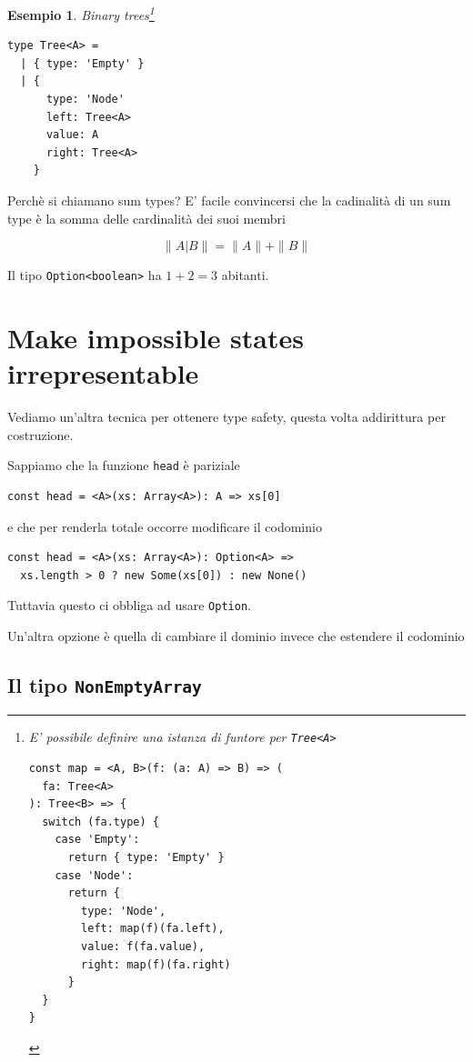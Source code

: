 \documentclass[12pt]{article}
\newtheorem{example}{Esempio}
\begin{document}
\begin{example}
Binary trees\footnote{E' possibile definire una istanza di funtore per \texttt{Tree<A>}

\begin{verbatim}
const map = <A, B>(f: (a: A) => B) => (
  fa: Tree<A>
): Tree<B> => {
  switch (fa.type) {
    case 'Empty':
      return { type: 'Empty' }
    case 'Node':
      return {
        type: 'Node',
        left: map(f)(fa.left),
        value: f(fa.value),
        right: map(f)(fa.right)
      }
  }
}
\end{verbatim}
}

\begin{verbatim}
type Tree<A> =
  | { type: 'Empty' }
  | {
      type: 'Node'
      left: Tree<A>
      value: A
      right: Tree<A>
    }
\end{verbatim}
\end{example}

Perchè si chiamano sum types? E' facile convincersi che la cadinalità di un sum type è la somma delle cardinalità dei suoi membri

$$
\|A | B\| = \|A\| + \|B\|
$$

Il tipo \texttt{Option<boolean>} ha $1 + 2 = 3$ abitanti.

\section{Make impossible states irrepresentable}

Vediamo un'altra tecnica per ottenere type safety, questa volta addirittura per costruzione.

Sappiamo che la funzione \texttt{head} è pariziale

\begin{verbatim}
const head = <A>(xs: Array<A>): A => xs[0]
\end{verbatim}

e che per renderla totale occorre modificare il codominio

\begin{verbatim}
const head = <A>(xs: Array<A>): Option<A> =>
  xs.length > 0 ? new Some(xs[0]) : new None()
\end{verbatim}

Tuttavia questo ci obbliga ad usare \texttt{Option}.

Un'altra opzione è quella di cambiare il dominio invece che estendere il codominio

\subsection{Il tipo \texttt{NonEmptyArray}}
\end{document}
